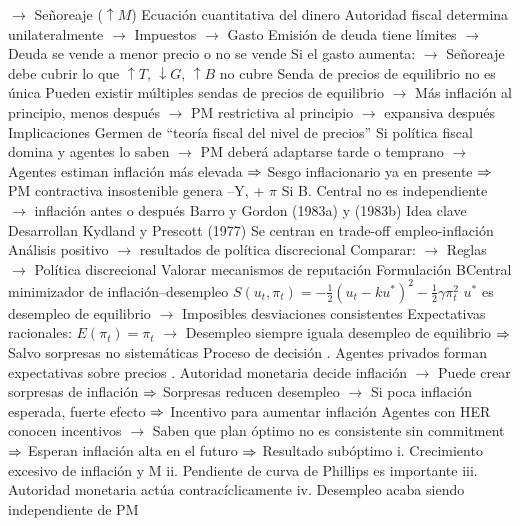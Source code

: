 \documentclass{nuevotema}
\begin{document}
\begin{esquemal}
				\4[] $\to$ Señoreaje ($\uparrow M$)
				\4[] Ecuación cuantitativa del dinero
				\4[] Autoridad fiscal determina unilateralmente
				\4[] $\to$ Impuestos
				\4[] $\to$ Gasto
				\4[] Emisión de deuda tiene límites
				\4[] $\to$ Deuda se vende a menor precio o no se vende
				\4[] Si el gasto aumenta:
				\4[] $\to$ Señoreaje debe cubrir lo que $\uparrow T$, $\downarrow G$, $\uparrow B$ no cubre
				\4[] Senda de precios de equilibrio no es única
				\4[] Pueden existir múltiples sendas de precios de equilibrio
				\4[] $\to$ Más inflación al principio, menos después
				\4[] $\to$ PM restrictiva al principio $\to$ expansiva después
				\4 Implicaciones
				\4[] Germen de ``teoría fiscal del nivel de precios''
				\4[] Si política fiscal domina y agentes lo saben
				\4[] $\to$ PM deberá adaptarse tarde o temprano
				\4[] $\to$ Agentes estiman inflación más elevada
				\4[] $\then$ Sesgo inflacionario ya en presente
				\4[] $\then$ PM contractiva insostenible genera --Y, + $\pi$
				\4[$\then$] Si B. Central no es independiente
				\4[]$\to$ inflación antes o después
			\3 Barro y Gordon (1983a) y (1983b)
				\4 Idea clave
				\4[] Desarrollan Kydland y Prescott (1977)
				\4[] Se centran en trade-off empleo-inflación
				\4[] Análisis positivo
				\4[] $\to$ resultados de política discrecional
				\4[] Comparar:
				\4[] $\to$ Reglas
				\4[] $\to$ Política discrecional
				\4[] Valorar mecanismos de reputación
				\4 Formulación
				\4[] BCentral minimizador de inflación--desempleo
				\4[] $S(u_t,\pi_t) = -\frac{1}{2} \left( u_t - k u^* \right)^2 - \frac{1}{2} \gamma \pi_t^2$
				\4[] $u^*$ es desempleo de equilibrio
				\4[] $\to$ Imposibles desviaciones consistentes
				\4[] Expectativas racionales:
				\4[] $E(\pi_t) = \pi_t$
				\4[] $\to$ Desempleo siempre iguala desempleo de equilibrio
				\4[] $\then$ Salvo sorpresas no sistemáticas
				\4[] Proceso de decisión
				. Agentes privados forman expectativas sobre precios
				. Autoridad monetaria decide inflación
				\4[] $\to$ Puede crear sorpresas de inflación
				\4[] $\then$ Sorpresas reducen desempleo
				\4[] $\to$ Si poca inflación esperada, fuerte efecto
				\4[] $\then$ Incentivo para aumentar inflación
				\4[] Agentes con HER conocen incentivos
				\4[] $\to$ Saben que plan óptimo no es consistente sin commitment
				\4[] $\then$ Esperan inflación alta en el futuro
				\4[] $\then$ Resultado subóptimo
				\4[] i. Crecimiento excesivo de inflación y M
				\4[] ii. Pendiente de curva de Phillips es importante
				\4[] iii. Autoridad monetaria actúa contracíclicamente
				\4[] iv. Desempleo acaba siendo independiente de PM

\end{esquemal}
\end{document}
